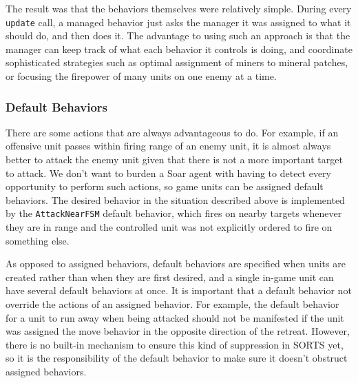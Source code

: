 The result was that the behaviors themselves were relatively simple.
During every {\tt update} call, a managed behavior just asks the manager
it was assigned to what it should do, and then does it. The advantage to
using such an approach is that the manager can keep track of what each
behavior it controls is doing, and coordinate sophisticated strategies
such as optimal assignment of miners to mineral patches, or focusing the
firepower of many units on one enemy at a time.

\subsubsection{Default Behaviors}

There are some actions that are always advantageous to do. For example,
if an offensive unit passes within firing range of an enemy unit, it is
almost always better to attack the enemy unit given that there is not a
more important target to attack. We don't want to burden a Soar agent
with having to detect every opportunity to perform such actions, so
game units can be assigned default behaviors. The desired behavior in
the situation described above is implemented by the {\tt AttackNearFSM}
default behavior, which fires on nearby targets whenever they are in
range and the controlled unit was not explicitly ordered to fire on
something else.

As opposed to assigned behaviors, default behaviors are specified
when units are created rather than when they are first desired, and
a single in-game unit can have several default behaviors at once.
It is important that a default behavior not override the actions
of an assigned behavior. For example, the default behavior for a
unit to run away when being attacked should not be manifested if the
unit was assigned the move behavior in the opposite direction of the
retreat. However, there is no built-in mechanism to ensure this kind of
suppression in SORTS yet, so it is the responsibility of the default
behavior to make sure it doesn't obstruct assigned behaviors.

